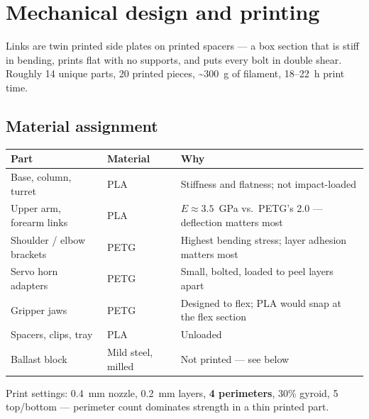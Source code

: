 \documentclass[11pt]{article}
\begin{document}
\section{Mechanical design and printing}
\label{sec:mechanical}

Links are twin printed side plates on printed spacers --- a box section that is stiff in bending, prints flat with no supports, and puts every bolt in double shear. Roughly 14 unique parts, 20 printed pieces, \textasciitilde300~g of filament, 18--22~h print time.

\subsection{Material assignment}
\begin{center}
\begin{tabular}{L{3.8cm}L{1.6cm}L{9.6cm}}
\toprule
\textbf{Part} & \textbf{Material} & \textbf{Why} \\
\midrule
Base, column, turret & PLA & Stiffness and flatness; not impact-loaded \\
Upper arm, forearm links & PLA & $E\approx3.5$~GPa vs.\ PETG's 2.0 --- deflection matters most \\
Shoulder / elbow brackets & PETG & Highest bending stress; layer adhesion matters most \\
Servo horn adapters & PETG & Small, bolted, loaded to peel layers apart \\
Gripper jaws & PETG & Designed to flex; PLA would snap at the flex section \\
Spacers, clips, tray & PLA & Unloaded \\
Ballast block & Mild steel, milled & Not printed --- see below \\
\bottomrule
\end{tabular}
\end{center}
Print settings: 0.4~mm nozzle, 0.2~mm layers, \textbf{4 perimeters}, 30\% gyroid, 5 top/bottom --- perimeter count dominates strength in a thin printed part.
\end{document}

